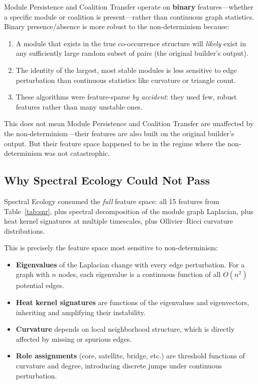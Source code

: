 \documentclass{../yalumba}
\begin{document}
\begin{keyfinding}
Module Persistence and Coalition Transfer operate on \textbf{binary}
features---whether a specific module or coalition is present---rather than
continuous graph statistics. Binary presence/absence is more robust to the
non-determinism because:
\begin{enumerate}[leftmargin=2em]
  \item A module that exists in the true co-occurrence structure will
    \textit{likely} exist in any sufficiently large random subset of pairs
    (the original builder's output).
  \item The identity of the largest, most stable modules is less sensitive to
    edge perturbation than continuous statistics like curvature or triangle
    count.
  \item These algorithms were feature-sparse \textit{by accident}: they used
    few, robust features rather than many unstable ones.
\end{enumerate}
\end{keyfinding}

This does not mean Module Persistence and Coalition Transfer are unaffected by
the non-determinism---their features are also built on the original builder's
output. But their feature space happened to be in the regime where the
non-determinism was not catastrophic.

\subsection{Why Spectral Ecology Could Not Pass}

Spectral Ecology consumed the \textit{full} feature space: all 15 features from
Table~\ref{tab:snr}, plus spectral decomposition of the module graph Laplacian,
plus heat kernel signatures at multiple timescales, plus Ollivier--Ricci
curvature distributions.

This is precisely the feature space most sensitive to non-determinism:
\begin{itemize}[leftmargin=2em]
  \item \textbf{Eigenvalues} of the Laplacian change with every edge
    perturbation. For a graph with $n$ nodes, each eigenvalue is a continuous
    function of all $O(n^2)$ potential edges.
  \item \textbf{Heat kernel signatures} are functions of the eigenvalues and
    eigenvectors, inheriting and amplifying their instability.
  \item \textbf{Curvature} depends on local neighborhood structure, which is
    directly affected by missing or spurious edges.
  \item \textbf{Role assignments} (core, satellite, bridge, etc.) are threshold
    functions of curvature and degree, introducing discrete jumps under
    continuous perturbation.
\end{itemize}
\end{document}
